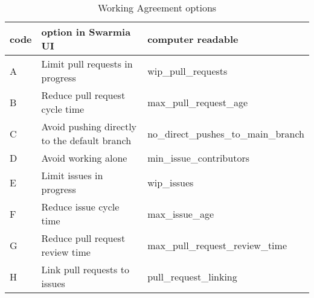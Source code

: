 \begin{table}[h]
\centering
\begin{tabularx}{\textwidth}{ |l|X|l| }
\hline
code & option in Swarmia UI & computer readable \\ [0.5ex] 
\hline\hline
A & Limit pull requests in progress & wip\_pull\_requests \\
B & Reduce pull request cycle time & max\_pull\_request\_age \\
C & Avoid pushing directly to the default branch & no\_direct\_pushes\_to\_main\_branch \\
D & Avoid working alone & min\_issue\_contributors  \\
E & Limit issues in progress & wip\_issues  \\
F & Reduce issue cycle time & max\_issue\_age  \\
G & Reduce pull request review time & max\_pull\_request\_review\_time  \\
H & Link pull requests to issues & pull\_request\_linking  \\
\hline
\end{tabularx}
\caption{Working Agreement options}
\label{tab:workingAgreements}
\end{table}



